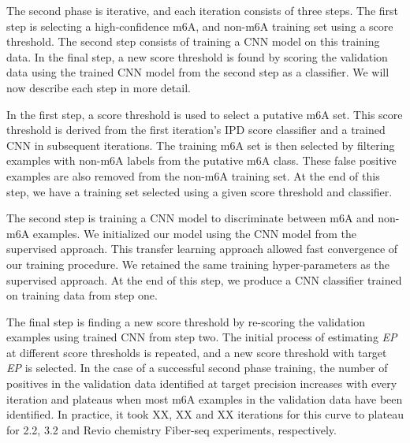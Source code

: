 \documentclass{article}
\begin{document}
The second phase is iterative, and each iteration consists of three steps. The first step is selecting a high-confidence m6A, and non-m6A training set using a score threshold. The second step consists of training a CNN model on this training data. In the final step, a new score threshold is found by scoring the validation data using the trained CNN model from the second step as a classifier. We will now describe each step in more detail. 

In the first step, a score threshold is used to select a putative m6A set. This score threshold is derived from the first iteration's IPD score classifier and a trained CNN in subsequent iterations. The training m6A set is then selected by filtering examples with non-m6A labels from the putative m6A class. These false positive examples are also removed from the non-m6A training set. At the end of this step, we have a training set selected using a given score threshold and classifier. 

The second step is training a CNN model to discriminate between m6A and non-m6A examples. We initialized our model using the CNN model from the supervised approach. This transfer learning approach allowed fast convergence of our training procedure. We retained the same training hyper-parameters as the supervised approach. At the end of this step, we produce a CNN classifier trained on training data from step one.

The final step is finding a new score threshold by re-scoring the validation examples using trained CNN from step two. The initial process of estimating \textit{EP} at different score thresholds is repeated, and a new score threshold with target \textit{EP} is selected. In the case of a successful second phase training, the number of positives in the validation data identified at target precision increases with every iteration and plateaus when most m6A examples in the validation data have been identified. In practice, it took  XX, XX and XX iterations for this curve to plateau for 2.2, 3.2 and Revio chemistry Fiber-seq experiments, respectively.  
\end{document}
